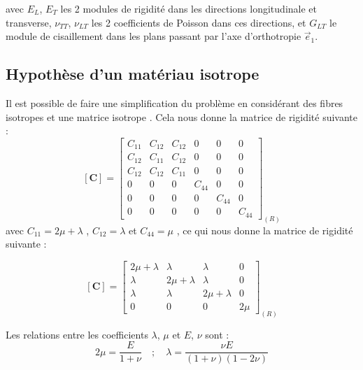 \documentclass[a4paper,11pt]{article}
\begin{document}
avec $E_L$, $E_T$ les 2 modules de rigidité dans les directions longitudinale et transverse, $\nu_{TT}$, $\nu_{LT}$ les 2 coefficients de Poisson dans ces directions, et $G_{LT}$ le module de cisaillement dans les plans passant par l'axe d'orthotropie $\vec{e}_1$.

\subsection*{Hypothèse d'un matériau isotrope}
%
Il est possible de faire une simplification du problème en considérant des fibres isotropes et une matrice isotrope \cite{Gornet2008}. Cela nous donne la matrice de rigidité suivante :
\begin{equation}
    \mathbf{[C]} =
    \left[
    \begin{array}{cccccc}
    C_{11}&C_{12}  & C_{12} & 0 & 0 & 0 \\
     C_{12}&C_{11}  & C_{12} & 0 & 0 & 0 \\
     C_{12}& C_{12} & C_{11} & 0 & 0 & 0 \\
    0 & 0 & 0 & C_{44} & 0 & 0 \\
    0 & 0 & 0 & 0 & C_{44} & 0 \\
    0 & 0 & 0 & 0 & 0 & C_{44}
    \end{array}
    \right]_{(R)}
\end{equation}
avec $C_{11}=2\mu+\lambda$ , $C_{12}=\lambda$ et $C_{44} =\mu$ , ce qui nous donne la matrice de rigidité suivante :

\begin{equation}
    \mathbf{[C]} =
    \left[
    \begin{array}{cccccc}
    2\mu+\lambda&\lambda  & \lambda & 0 \\
     \lambda&2\mu+\lambda  & \lambda & 0 \\
     \lambda& \lambda & 2\mu+\lambda & 0\\
    0 & 0 & 0 & 2\mu
    \end{array}
    \right]_{(R)}
\end{equation}

Les relations entre les coefficients $\lambda$, $\mu$ et $E$, $\nu$ sont :
\begin{equation}
2\mu = \frac{E}{1+\nu} \quad ; \quad \lambda = \frac{\nu E}{(1+\nu)(1-2\nu)}
\end{equation}
\end{document}
